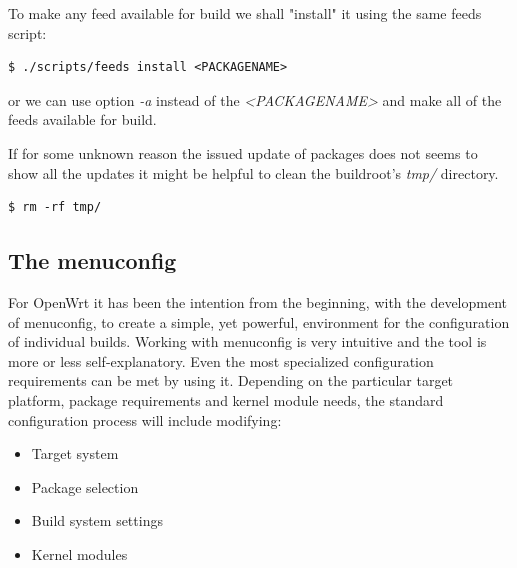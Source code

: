 To make any feed available for build we shall "install" it using the same feeds script:
\begin{lstlisting}[columns=fixed,basicstyle=\ttfamily\footnotesize,tabsize=4,backgroundcolor=\color{yellow!10}]
$ ./scripts/feeds install <PACKAGENAME>
\end{lstlisting}
or we can use option {\it -a} instead of the {\it <PACKAGENAME>} and make all of the feeds available for build.

If for some unknown reason the issued update of packages does not seems to show all the updates it might be helpful to clean the buildroot's {\it tmp/} directory\cite{feeds}.
\begin{lstlisting}[columns=fixed,basicstyle=\ttfamily\footnotesize,tabsize=4,backgroundcolor=\color{yellow!10}]
$ rm -rf tmp/
\end{lstlisting}

\subsection{The menuconfig}

For OpenWrt it has been the intention from the beginning, with the development of menuconfig, to create a simple, yet powerful, environment for the configuration of individual builds.
Working with menuconfig is very intuitive and the tool is more or less self-explanatory.
Even the most specialized configuration requirements can be met by using it.
Depending on the particular target platform, package requirements and kernel module needs, the standard configuration process will include modifying:
\begin{itemize}
    \item Target system
    \item Package selection
    \item Build system settings
    \item Kernel modules
\end{itemize}

